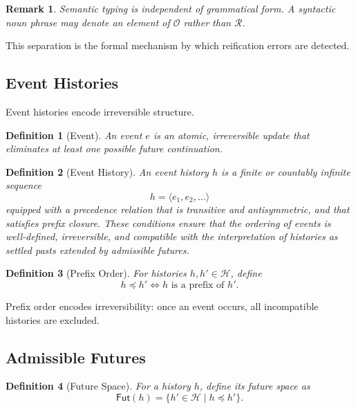 \documentclass[11pt]{article}
\newtheorem{definition}{Definition}
\newtheorem{remark}{Remark}
\begin{document}
\begin{remark}
Semantic typing is independent of grammatical form. A syntactic noun phrase may
denote an element of $\mathcal{O}$ rather than $\mathcal{R}$.
\end{remark}

This separation is the formal mechanism by which reification errors are detected.

\subsection{Event Histories}

Event histories encode irreversible structure.

\begin{definition}[Event]
An event $e$ is an atomic, irreversible update that eliminates at least one
possible future continuation.
\end{definition}

\begin{definition}[Event History]
An event history $h$ is a finite or countably infinite sequence
\[
h = \langle e_1, e_2, \dots \rangle
\]
equipped with a precedence relation that is transitive and antisymmetric, and
that satisfies prefix closure. These conditions ensure that the ordering of
events is well-defined, irreversible, and compatible with the interpretation of
histories as settled pasts extended by admissible futures.
\end{definition}


\begin{definition}[Prefix Order]
For histories $h, h' \in \mathcal{H}$, define
\[
h \preceq h' \iff h \text{ is a prefix of } h'.
\]
\end{definition}

Prefix order encodes irreversibility: once an event occurs, all incompatible
histories are excluded.

\subsection{Admissible Futures}

\begin{definition}[Future Space]
For a history $h$, define its future space as
\[
\mathsf{Fut}(h) = \{ h' \in \mathcal{H} \mid h \preceq h' \}.
\]
\end{definition}
\end{document}
